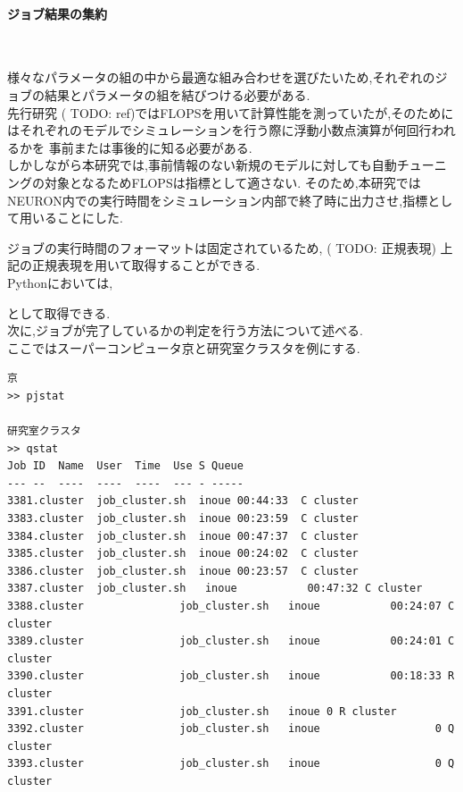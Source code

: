 \paragraph{ジョブ結果の集約}~\\
{\footnotesize

}
様々なパラメータの組の中から最適な組み合わせを選びたいため,それぞれのジョブの結果とパラメータの組を結びつける必要がある.\\
先行研究 ( TODO: ref)ではFLOPSを用いて計算性能を測っていたが,そのためにはそれぞれのモデルでシミュレーションを行う際に浮動小数点演算が何回行われるかを
事前または事後的に知る必要がある.\\
しかしながら本研究では,事前情報のない新規のモデルに対しても自動チューニングの対象となるためFLOPSは指標として適さない.
そのため,本研究ではNEURON内での実行時間をシミュレーション内部で終了時に出力させ,指標として用いることにした.\\
{\footnotesize

}
{\footnotesize

}
ジョブの実行時間のフォーマットは固定されているため,
( TODO: 正規表現)
上記の正規表現を用いて取得することができる.\\
Pythonにおいては,
{\footnotesize

}
として取得できる.\\
次に,ジョブが完了しているかの判定を行う方法について述べる.\\
ここではスーパーコンピュータ京と研究室クラスタを例にする.\\
{\footnotesize
\begin{lstlisting}[numbers=none]
京
>> pjstat

研究室クラスタ
>> qstat
Job ID  Name  User  Time  Use S Queue
--- --  ----  ----  ----  --- - -----
3381.cluster  job_cluster.sh  inoue 00:44:33  C cluster
3383.cluster  job_cluster.sh  inoue 00:23:59  C cluster
3384.cluster  job_cluster.sh  inoue 00:47:37  C cluster
3385.cluster  job_cluster.sh  inoue 00:24:02  C cluster
3386.cluster  job_cluster.sh  inoue 00:23:57  C cluster
3387.cluster  job_cluster.sh   inoue           00:47:32 C cluster
3388.cluster               job_cluster.sh   inoue           00:24:07 C cluster
3389.cluster               job_cluster.sh   inoue           00:24:01 C cluster
3390.cluster               job_cluster.sh   inoue           00:18:33 R cluster
3391.cluster               job_cluster.sh   inoue 0 R cluster
3392.cluster               job_cluster.sh   inoue                  0 Q cluster
3393.cluster               job_cluster.sh   inoue                  0 Q cluster
\end{lstlisting}
}
